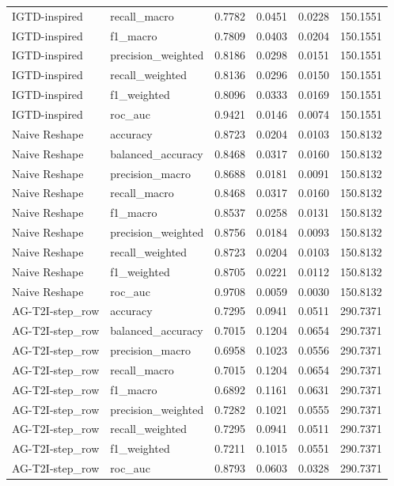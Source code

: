 \begin{tabular}{llrrrr}
IGTD-inspired & recall_macro & 0.7782 & 0.0451 & 0.0228 & 150.1551 \\
IGTD-inspired & f1_macro & 0.7809 & 0.0403 & 0.0204 & 150.1551 \\
IGTD-inspired & precision_weighted & 0.8186 & 0.0298 & 0.0151 & 150.1551 \\
IGTD-inspired & recall_weighted & 0.8136 & 0.0296 & 0.0150 & 150.1551 \\
IGTD-inspired & f1_weighted & 0.8096 & 0.0333 & 0.0169 & 150.1551 \\
IGTD-inspired & roc_auc & 0.9421 & 0.0146 & 0.0074 & 150.1551 \\
Naive Reshape & accuracy & 0.8723 & 0.0204 & 0.0103 & 150.8132 \\
Naive Reshape & balanced_accuracy & 0.8468 & 0.0317 & 0.0160 & 150.8132 \\
Naive Reshape & precision_macro & 0.8688 & 0.0181 & 0.0091 & 150.8132 \\
Naive Reshape & recall_macro & 0.8468 & 0.0317 & 0.0160 & 150.8132 \\
Naive Reshape & f1_macro & 0.8537 & 0.0258 & 0.0131 & 150.8132 \\
Naive Reshape & precision_weighted & 0.8756 & 0.0184 & 0.0093 & 150.8132 \\
Naive Reshape & recall_weighted & 0.8723 & 0.0204 & 0.0103 & 150.8132 \\
Naive Reshape & f1_weighted & 0.8705 & 0.0221 & 0.0112 & 150.8132 \\
Naive Reshape & roc_auc & 0.9708 & 0.0059 & 0.0030 & 150.8132 \\
AG-T2I-step_row & accuracy & 0.7295 & 0.0941 & 0.0511 & 290.7371 \\
AG-T2I-step_row & balanced_accuracy & 0.7015 & 0.1204 & 0.0654 & 290.7371 \\
AG-T2I-step_row & precision_macro & 0.6958 & 0.1023 & 0.0556 & 290.7371 \\
AG-T2I-step_row & recall_macro & 0.7015 & 0.1204 & 0.0654 & 290.7371 \\
AG-T2I-step_row & f1_macro & 0.6892 & 0.1161 & 0.0631 & 290.7371 \\
AG-T2I-step_row & precision_weighted & 0.7282 & 0.1021 & 0.0555 & 290.7371 \\
AG-T2I-step_row & recall_weighted & 0.7295 & 0.0941 & 0.0511 & 290.7371 \\
AG-T2I-step_row & f1_weighted & 0.7211 & 0.1015 & 0.0551 & 290.7371 \\
AG-T2I-step_row & roc_auc & 0.8793 & 0.0603 & 0.0328 & 290.7371 \\

\end{tabular}
